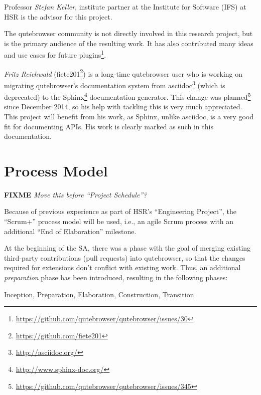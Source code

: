 \documentclass[a4paper,parskip=full]{scrreprt}
\newcommand{\fixme}[1]{\textbf{FIXME} \emph{#1}}
\begin{document}
Professor \emph{Stefan Keller}, institute partner at the Institute for Software
(IFS) at HSR is the advisor for this project.

The qutebrowser community is not directly involved in this research project, but
is the primary audience of the resulting work. It has also contributed many
ideas and use cases for future
plugins\footnote{\url{https://github.com/qutebrowser/qutebrowser/issues/30}}.

\label{fiete}
\emph{Fritz Reichwald} (fiete201\footnote{\url{https://github.com/fiete201}})
is a long-time qutebrowser user who is working on migrating qutebrowser's
documentation system from asciidoc\footnote{\url{http://asciidoc.org/}} (which
is deprecated) to the Sphinx\footnote{\url{http://www.sphinx-doc.org/}}
documentation generator. This change was
planned\footnote{\url{https://github.com/qutebrowser/qutebrowser/issues/345}}
since December 2014, so his help with tackling this is very much appreciated.
This project will benefit from his work, as Sphinx, unlike asciidoc, is a
very good fit for documenting APIs. His work is clearly marked as such in this
documentation.

\section{Process Model}
\fixme{Move this before ``Project Schedule''?}

Because of previous experience as part of HSR's ``Engineering Project'', the
``Scrum+'' process model will be used, i.e., an agile Scrum process with an
additional ``End of Elaboration'' milestone.

At the beginning of the SA, there was a phase with the goal of merging existing
third-party contributions (pull requests) into qutebrowser, so that the changes
required for extensions don't conflict with existing work. Thus, an additional
\emph{preparation} phase has been introduced, resulting in the following phases:

Inception, Preparation, Elaboration, Construction, Transition

\end{document}
